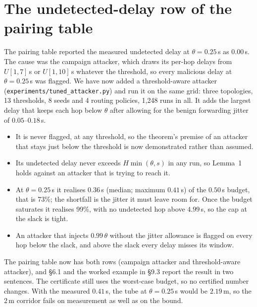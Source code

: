 \documentclass[11pt,a4paper]{article}
\begin{document}
\section{The undetected-delay row of the pairing table}

The pairing table reported the measured undetected delay at $\theta=0.25$\,s as
$0.00$\,s. The cause was the campaign attacker, which draws its per-hop delays from
$U[1,7]$\,s or $U[1,10]$\,s whatever the threshold, so every malicious delay at
$\theta=0.25$\,s was flagged. We have now added a threshold-aware attacker
(\texttt{experiments/tuned\_attacker.py}) and run it on the same grid: three
topologies, 13 thresholds, 8 seeds and 4 routing policies, 1{,}248 runs in all. It
adds the largest delay that keeps each hop below $\theta$ after allowing for the
benign forwarding jitter of $0.05$--$0.18$\,s.
\begin{itemize}[leftmargin=1.4em,itemsep=2pt]
\item It is never flagged, at any threshold, so the theorem's premise of an
attacker that stays just below the threshold is now demonstrated rather than
assumed.
\item Its undetected delay never exceeds $H\min(\theta,s)$ in any run, so
Lemma~1 holds against an attacker that is trying to reach it.
\item At $\theta=0.25$\,s it realises $0.36$\,s (median; maximum $0.41$\,s) of the
$0.50$\,s budget, that is 73\%; the shortfall is the jitter it must leave room for.
Once the budget saturates it realises 99\%, with no undetected hop above $4.99$\,s,
so the cap at the slack is tight.
\item An attacker that injects $0.99\,\theta$ without the jitter allowance is
flagged on every hop below the slack, and above the slack every delay misses its
window.
\end{itemize}
The pairing table now has both rows (campaign attacker and threshold-aware
attacker), and \S6.1 and the worked example in \S9.3 report the result in two
sentences. The certificate still uses the worst-case budget, so no certified
number changes. With the measured $0.41$\,s, the tube at $\theta=0.25$\,s would be
$2.19$\,m, so the $2$\,m corridor fails on measurement as well as on the bound.
\end{document}
